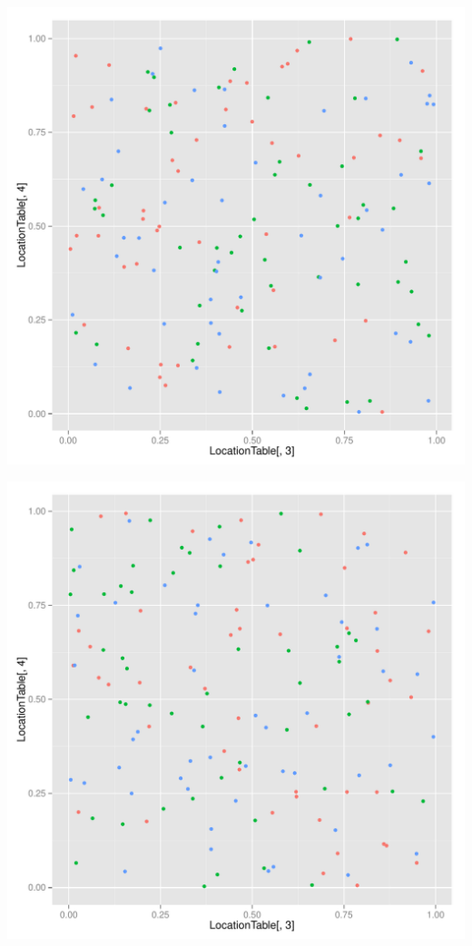 \documentclass{article}\usepackage[]{graphicx}\usepackage[]{color}
\makeatletter
\def\maxwidth{ %
  \ifdim\Gin@nat@width>\linewidth
    \linewidth
  \else
    \Gin@nat@width
  \fi
}
\newenvironment{knitrout}{}{} %
\makeatother
\begin{document}
\begin{knitrout}
\includegraphics[width=\maxwidth]{figure/unnamed-chunk-2-14} 

\includegraphics[width=\maxwidth]{figure/unnamed-chunk-2-15} 


\end{knitrout}
\end{document}
